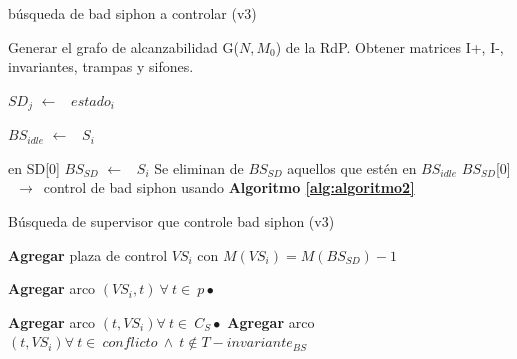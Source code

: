 \begin{algorithm} [H]
  \caption{búsqueda de bad siphon a controlar (v3)}
  \label{alg:algoritmo1} 
  \begin{algorithmic}[1]
 
 
    \State Generar el grafo de alcanzabilidad G($N,M_0$) de la RdP.
    \State Obtener matrices I+, I-, invariantes, trampas y sifones.
 
            \State $SD_j$ $\leftarrow$ \ $estado_i$
        \EndIf
    \EndFor
    
                \State $BS_{idle}$ $\leftarrow$ \  $S_i$
            \EndIf
        \EndFor
    \EndIf
    
    \State en SD[0]
            \State $BS_{SD}$ $\leftarrow$ \ $S_i$  
        \EndIf
    \EndFor
    \State Se eliminan de $BS_{SD}$ aquellos que estén en $BS_{idle}$ 
    \State $BS_{SD}$[0] \  $\rightarrow$\ control de bad siphon usando \textbf{Algoritmo \ref{alg:algoritmo2}}
  \end{algorithmic}
\end{algorithm}
\bigskip

\begin{algorithm}[H] 
  \caption{Búsqueda de supervisor que controle bad siphon (v3)}
  \label{alg:algoritmo2} 
  \begin{algorithmic}[1]
 
 
    \State \textbf{Agregar} plaza de control $VS_i$ con $M(VS_i)= M(BS_{SD}) - 1$
    
            \State \textbf{Agregar} arco $(VS_i , t) \ \forall \  t \in \ p\bullet$
    \EndIf
 
    \State \textbf{Agregar} arco $(t, VS_i) \forall \ t \in \ C_S\bullet$
    \State \textbf{Agregar} arco $(t, VS_i)  \forall \ t \in \ conflicto \ \wedge \ t \notin T-invariante_{BS}$
  \end{algorithmic}
\end{algorithm}
\bigskip


